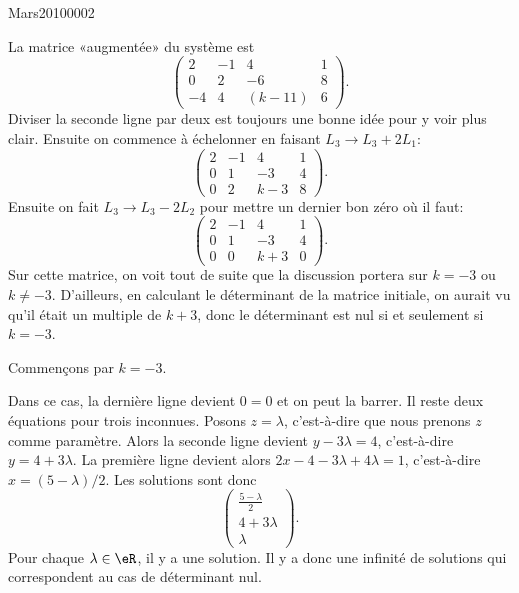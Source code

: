 

\begin{corrige}{Mars20100002}

	La matrice «augmentée» du système est
	\begin{equation}
		\left(\begin{array}{ccc|c}
			 2	&	-1	&	4	&	1	\\
			  0	&	2	&	-6	&	8\\
			   -4	&	4	&	(k-11)	&	6	 
		   \end{array}\right).
	\end{equation}
	Diviser la seconde ligne par deux est toujours une bonne idée pour y voir plus clair. Ensuite on commence à échelonner en faisant $L_3\to L_3+2L_1$:
	\begin{equation}
		\left(\begin{array}{ccc|c}
			 2	&	-1	&	4	&	1	\\
			  0	&	1	&	-3	&	4\\
			   0	&	2	&	k-3	&	8	 
		   \end{array}\right).
	\end{equation}
	Ensuite on fait $L_3\to L_3-2L_2$ pour mettre un dernier bon zéro où il faut:
	\begin{equation}
		\left(\begin{array}{ccc|c}
			 2	&	-1	&	4	&	1	\\
			  0	&	1	&	-3	&	4\\
			   0	&	0	&	k+3	&	0	 
		   \end{array}\right).
	\end{equation}
	Sur cette matrice, on voit tout de suite que la discussion portera sur $k=-3$ ou $k\neq -3$. D'ailleurs, en calculant le déterminant de la matrice initiale, on aurait vu qu'il était un multiple de $k+3$, donc le déterminant est nul si et seulement si $k=-3$.

	Commençons par $k=-3$.

	Dans ce cas, la dernière ligne devient $0=0$ et on peut la barrer. Il reste deux équations pour trois inconnues. Posons $z=\lambda$, c'est-à-dire que nous prenons $z$ comme paramètre. Alors la seconde ligne devient $y-3\lambda=4$, c'est-à-dire $y=4+3\lambda$. La première ligne devient alors $2x-4-3\lambda+4\lambda=1$, c'est-à-dire $x=(5-\lambda)/2$. Les solutions sont donc
	\begin{equation}
		\begin{pmatrix}
			\frac{ 5-\lambda }{2}	\\ 
			4+3\lambda	\\ 
			\lambda	
		\end{pmatrix}.
	\end{equation}
	Pour chaque $\lambda\in\eR$, il y a une solution. Il y a donc une infinité de solutions qui correspondent au cas de déterminant nul.


\end{corrige}
